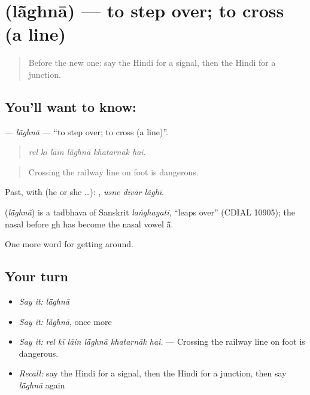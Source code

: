 \section[\texorpdfstring{\hi{लाँघना} (lā̃ghnā)}{लाँघना (lā̃ghnā)}]{ (lā̃ghnā) — to step over; to cross (a line)}

\label{lesson:HI-C401-laghna}



\begin{quote}
Before the new one: say the Hindi for a signal, then the Hindi for a junction.
\end{quote}

\subsection*{You'll want to know: }
\textbf{} — \emph{lā̃ghnā} — \textquotedblleft{}to step over; to cross (a line)\textquotedblright{}.

\begin{quote}
     
\end{quote}

\begin{quote}
\emph{rel kī lāin lā̃ghnā khatarnāk hai.}
\end{quote}

\begin{quote}
Crossing the railway line on foot is dangerous.
\end{quote}

Past, with  (he or she …):   , \emph{usne dīvār lā̃ghī}.

\begin{cousinweb}
\textbf{} (\emph{lā̃ghnā}) is a tadbhava of Sanskrit \emph{laṅghayati}, \textquotedblleft{}leaps over\textquotedblright{} (CDIAL 10905); the nasal before gh has become the nasal vowel ā̃.
\end{cousinweb}

\begin{grammarlens}[title={What you've built}]
One more word for getting around.
\end{grammarlens}

\subsection*{Your turn}
\begin{itemize}
\raggedright
  \item \emph{Say it:} \emph{lā̃ghnā}
  \item \emph{Say it:} \emph{lā̃ghnā}, once more
  \item \emph{Say it:} \emph{rel kī lāin lā̃ghnā khatarnāk hai.} — Crossing the railway line on foot is dangerous.
  \item \emph{Recall:} say the Hindi for a signal, then the Hindi for a junction, then say \emph{lā̃ghnā} again
\end{itemize}

